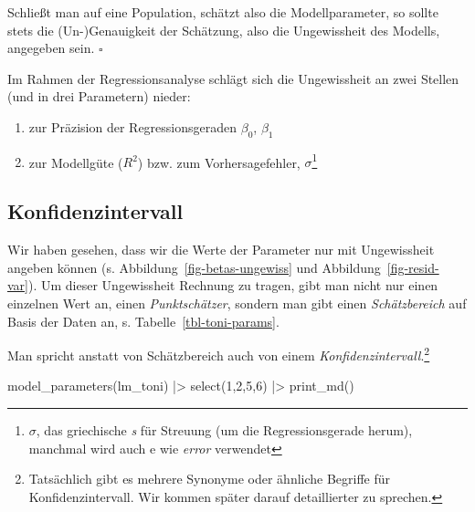 \documentclass[
  ngerman,
  letterpaper,
  twoside,
  open=any]{scrbook}
\newenvironment{Shaded}{\begin{snugshade}}{\end{snugshade}}
\newcommand{\DecValTok}[1]{\textcolor[rgb]{0.68,0.00,0.00}{#1}}
\newcommand{\FunctionTok}[1]{\textcolor[rgb]{0.28,0.35,0.67}{#1}}
\newcommand{\NormalTok}[1]{\textcolor[rgb]{0.00,0.23,0.31}{#1}}
\newcommand{\SpecialCharTok}[1]{\textcolor[rgb]{0.37,0.37,0.37}{#1}}
\providecommand{\tightlist}{%
  \setlength{\itemsep}{0pt}\setlength{\parskip}{0pt}}\usepackage{longtable,booktabs,array}
\theoremstyle{definition}
\theoremstyle{plain}
\theoremstyle{definition}
\theoremstyle{definition}
\theoremstyle{definition}
\theoremstyle{definition}
\theoremstyle{remark}
\begin{document}
\begin{tcolorbox}[enhanced jigsaw, arc=.35mm, bottomrule=.15mm, bottomtitle=1mm, breakable, colback=white, colbacktitle=quarto-callout-important-color!10!white, colframe=quarto-callout-important-color-frame, coltitle=black, left=2mm, leftrule=.75mm, opacityback=0, opacitybacktitle=0.6, rightrule=.15mm, title=\textcolor{quarto-callout-important-color}{\faExclamation}\hspace{0.5em}{Wichtig}, titlerule=0mm, toprule=.15mm, toptitle=1mm]

Schließt man auf eine Population, schätzt also die Modellparameter, so
sollte stets die (Un-)Genauigkeit der Schätzung, also die Ungewissheit
des Modells, angegeben sein. \(\square\)

\end{tcolorbox}

Im Rahmen der Regressionsanalyse schlägt sich die Ungewissheit an zwei
Stellen (und in drei Parametern) nieder:

\begin{enumerate}
\def\labelenumi{\arabic{enumi}.}
\tightlist
\item
  zur Präzision der Regressionsgeraden \(\beta_0\), \(\beta_1\)
\item
  zur Modellgüte (\(R^2\)) bzw. zum Vorhersagefehler,
  \(\sigma\)\footnote{\(\sigma\), das griechische \emph{s} für Streuung
    (um die Regressionsgerade herum), manchmal wird auch e wie
    \emph{error} verwendet}
\end{enumerate}

\subsection{Konfidenzintervall}\label{konfidenzintervall}

Wir haben gesehen, dass wir die Werte der Parameter nur mit Ungewissheit
angeben können (s. Abbildung~\ref{fig-betas-ungewiss} und
Abbildung~\ref{fig-resid-var}). Um dieser Ungewissheit Rechnung zu
tragen, gibt man nicht nur einen einzelnen Wert an, einen
\emph{Punktschätzer}, sondern man gibt einen \emph{Schätzbereich} auf
Basis der Daten an, s. Tabelle~\ref{tbl-toni-params}.

Man spricht anstatt von Schätzbereich auch von einem
\emph{Konfidenzintervall}.\footnote{Tatsächlich gibt es mehrere Synonyme
  oder ähnliche Begriffe für Konfidenzintervall. Wir kommen später
  darauf detaillierter zu sprechen.}

\begin{Shaded}
\begin{Highlighting}[]
\FunctionTok{model\_parameters}\NormalTok{(lm\_toni) }\SpecialCharTok{|\textgreater{}}
  \FunctionTok{select}\NormalTok{(}\DecValTok{1}\NormalTok{,}\DecValTok{2}\NormalTok{,}\DecValTok{5}\NormalTok{,}\DecValTok{6}\NormalTok{) }\SpecialCharTok{|\textgreater{}}
  \FunctionTok{print\_md}\NormalTok{()}
\end{Highlighting}
\end{Shaded}
\end{document}
